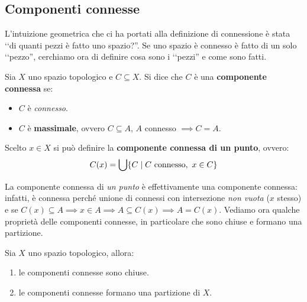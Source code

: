 \subsection{Componenti connesse}
L'intuizione geometrica che ci ha portati alla definizione di connessione è stata ‘‘di quanti pezzi è fatto uno spazio?''. Se uno spazio è connesso è fatto di un solo ‘‘pezzo'', cerchiamo ora di definire cosa sono i ‘‘pezzi'' e come sono fatti.
\begin{define}
	Sia $X$ uno spazio topologico e $C\subseteq X$. Si dice che $C$ è una \textbf{componente connessa} se:
		\begin{itemize}
			\item $C$ è \textit{connesso}.
			\item $C$ è \textbf{massimale}, ovvero $C\subseteq A$, $A$ connesso $\implies C=A$.
		\end{itemize}
	Scelto $x\in X$ si può definire la \textbf{componente connessa di un punto}, ovvero:
	\begin{equation}
		\displaystyle C(x)=\mathop{{\bigcup}}\displaylimits \{C \mid C\text{ connesso},\ x\in C\}
	\end{equation}
\vspace{-6mm}
\end{define}
La componente connessa di \textit{un punto} è effettivamente una componente connessa: infatti, è connessa perché unione di connessi con intersezione \textit{non vuota} ($x$ stesso) e se $C(x)\subseteq A \implies x\in A \implies A\subseteq C(x) \implies A=C(x)$.\newline
Vediamo ora qualche proprietà delle componenti connesse, in particolare che sono chiuse e formano una partizione.
\begin{theorema}
	Sia $X$ uno spazio topologico, allora:
		\begin{enumerate}
			\item le componenti connesse sono chiuse.
			\item le componenti connesse formano una partizione di $X$.
		\end{enumerate}
	\vspace{-3mm}
\end{theorema}
